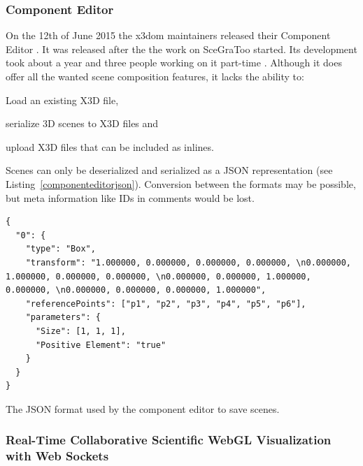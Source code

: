 \clearpage

\subsubsection{Component Editor}
\label{component-editor30}

On the 12th of June 2015 the x3dom maintainers released their Component Editor \cite{componenteditor}.
It was released after the the work on \gls{SceGraToo} started.
Its development took about a year and three people working on it part-time \cite{componenteditoreffort}.
Although it does offer all the wanted scene composition features, it lacks the ability to:

\begin{itemize*}
  \item Load an existing \gls{X3D} file,
  \item serialize 3D scenes to \gls{X3D} files and
  \item upload \gls{X3D} files that can be included as inlines.
\end{itemize*}

Scenes can only be deserialized and serialized as a \gls{JSON} representation (see Listing~\ref{componenteditorjson}).
Conversion between the formats may be possible, but meta information like \glspl{ID} in comments would be lost.

\begin{listing}
  \begin{verbatim}
{
  "0": {
    "type": "Box",
    "transform": "1.000000, 0.000000, 0.000000, 0.000000, \n0.000000, 1.000000, 0.000000, 0.000000, \n0.000000, 0.000000, 1.000000, 0.000000, \n0.000000, 0.000000, 0.000000, 1.000000",
    "referencePoints": ["p1", "p2", "p3", "p4", "p5", "p6"],
    "parameters": {
      "Size": [1, 1, 1],
      "Positive Element": "true"
    }
  }
}
  \end{verbatim}
  \caption{The \gls{JSON} format used by the component editor to save scenes.}
  \label{componenteditorjson}
\end{listing}

\subsubsection{Real-Time Collaborative Scientific WebGL Visualization with Web Sockets}
\label{rtcswvwws}

